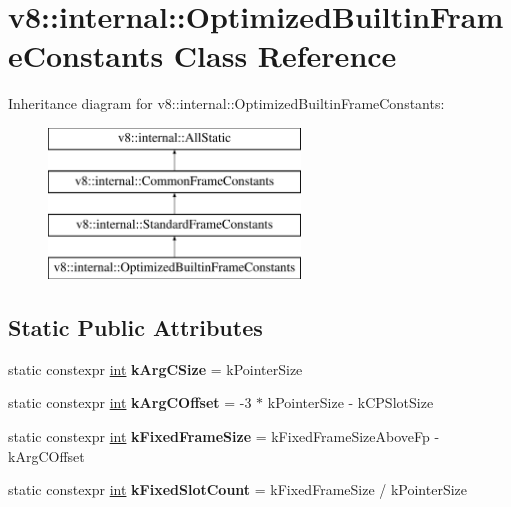 \hypertarget{classv8_1_1internal_1_1OptimizedBuiltinFrameConstants}{}\section{v8\+:\+:internal\+:\+:Optimized\+Builtin\+Frame\+Constants Class Reference}
\label{classv8_1_1internal_1_1OptimizedBuiltinFrameConstants}
Inheritance diagram for v8\+:\+:internal\+:\+:Optimized\+Builtin\+Frame\+Constants\+:\begin{figure}[H]
\begin{center}
\leavevmode
\includegraphics[height=4.000000cm]{classv8_1_1internal_1_1OptimizedBuiltinFrameConstants}
\end{center}
\end{figure}
\subsection*{Static Public Attributes}
\begin{DoxyCompactItemize}
\item 
\mbox{\label{classv8_1_1internal_1_1OptimizedBuiltinFrameConstants_a3aa35afad6159c68f006a63c1b797d25}} 
static constexpr \mbox{\hyperlink{classint}{int}} {\bfseries k\+Arg\+C\+Size} = k\+Pointer\+Size
\item 
\mbox{\label{classv8_1_1internal_1_1OptimizedBuiltinFrameConstants_a5453bd79c225dbcabcc23bafe36abb31}} 
static constexpr \mbox{\hyperlink{classint}{int}} {\bfseries k\+Arg\+C\+Offset} = -\/3 $\ast$ k\+Pointer\+Size -\/ k\+C\+P\+Slot\+Size
\item 
\mbox{\label{classv8_1_1internal_1_1OptimizedBuiltinFrameConstants_a677ac73fc8942425cac619475fca6c92}} 
static constexpr \mbox{\hyperlink{classint}{int}} {\bfseries k\+Fixed\+Frame\+Size} = k\+Fixed\+Frame\+Size\+Above\+Fp -\/ k\+Arg\+C\+Offset
\item 
\mbox{\label{classv8_1_1internal_1_1OptimizedBuiltinFrameConstants_a40fa4b2446f85fa8348bbbe065ac7df6}} 
static constexpr \mbox{\hyperlink{classint}{int}} {\bfseries k\+Fixed\+Slot\+Count} = k\+Fixed\+Frame\+Size / k\+Pointer\+Size
\end{DoxyCompactItemize}


